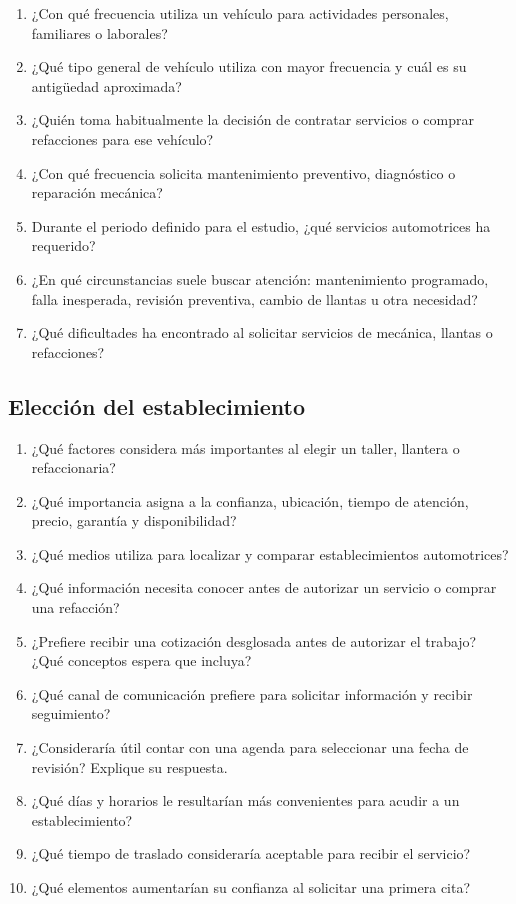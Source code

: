 \documentclass[12pt,letterpaper,oneside]{article}
\begin{document}
\begin{enumerate}
    \item ¿Con qué frecuencia utiliza un vehículo para actividades personales, familiares o laborales?
    \item ¿Qué tipo general de vehículo utiliza con mayor frecuencia y cuál es su antigüedad aproximada?
    \item ¿Quién toma habitualmente la decisión de contratar servicios o comprar refacciones para ese vehículo?
    \item ¿Con qué frecuencia solicita mantenimiento preventivo, diagnóstico o reparación mecánica?
    \item Durante el periodo definido para el estudio, ¿qué servicios automotrices ha requerido?
    \item ¿En qué circunstancias suele buscar atención: mantenimiento programado, falla inesperada, revisión preventiva, cambio de llantas u otra necesidad?
    \item ¿Qué dificultades ha encontrado al solicitar servicios de mecánica, llantas o refacciones?
\end{enumerate}

\subsection{Elección del establecimiento}

\begin{enumerate}
    \item ¿Qué factores considera más importantes al elegir un taller, llantera o refaccionaria?
    \item ¿Qué importancia asigna a la confianza, ubicación, tiempo de atención, precio, garantía y disponibilidad?
    \item ¿Qué medios utiliza para localizar y comparar establecimientos automotrices?
    \item ¿Qué información necesita conocer antes de autorizar un servicio o comprar una refacción?
    \item ¿Prefiere recibir una cotización desglosada antes de autorizar el trabajo? ¿Qué conceptos espera que incluya?
    \item ¿Qué canal de comunicación prefiere para solicitar información y recibir seguimiento?
    \item ¿Consideraría útil contar con una agenda para seleccionar una fecha de revisión? Explique su respuesta.
    \item ¿Qué días y horarios le resultarían más convenientes para acudir a un establecimiento?
    \item ¿Qué tiempo de traslado consideraría aceptable para recibir el servicio?
    \item ¿Qué elementos aumentarían su confianza al solicitar una primera cita?
\end{enumerate}
\end{document}
